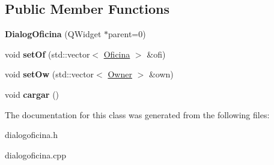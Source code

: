 \subsection*{Public Member Functions}
\begin{DoxyCompactItemize}
\item 
\hypertarget{classDialogOficina_a3ad9c07c53db92bc142f57a8ff2f882d}{}{\bfseries Dialog\+Oficina} (Q\+Widget $\ast$parent=0)\label{classDialogOficina_a3ad9c07c53db92bc142f57a8ff2f882d}

\item 
\hypertarget{classDialogOficina_a007a57b696f328e8ecf439e60cd2e034}{}void {\bfseries set\+Of} (std\+::vector$<$ \hyperlink{classOficina}{Oficina} $>$ \&ofi)\label{classDialogOficina_a007a57b696f328e8ecf439e60cd2e034}

\item 
\hypertarget{classDialogOficina_a91bf5c089d49dd8c3f3cfd14e3ff0a59}{}void {\bfseries set\+Ow} (std\+::vector$<$ \hyperlink{classOwner}{Owner} $>$ \&own)\label{classDialogOficina_a91bf5c089d49dd8c3f3cfd14e3ff0a59}

\item 
\hypertarget{classDialogOficina_a0e28e820df54cad3652e7d36a2fd01bc}{}void {\bfseries cargar} ()\label{classDialogOficina_a0e28e820df54cad3652e7d36a2fd01bc}

\end{DoxyCompactItemize}


The documentation for this class was generated from the following files\+:\begin{DoxyCompactItemize}
\item 
dialogoficina.\+h\item 
dialogoficina.\+cpp\end{DoxyCompactItemize}

